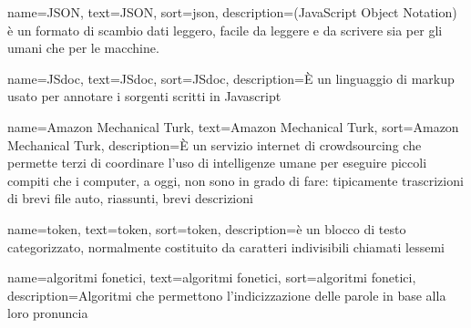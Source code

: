 {
    name=JSON,
    text=JSON,
    sort=json,
    description={(JavaScript Object Notation) è un formato di scambio dati leggero, facile da leggere e da scrivere sia per gli umani che per le macchine.}
}

{
    name=JSdoc,
    text=JSdoc,
    sort=JSdoc,
    description={È un linguaggio di markup usato per annotare i sorgenti scritti in Javascript}
}

{
    name=Amazon Mechanical Turk,
    text=Amazon Mechanical Turk,
    sort=Amazon Mechanical Turk,
    description={È un servizio internet di crowdsourcing che permette terzi di coordinare l'uso di intelligenze umane per eseguire piccoli compiti che i computer, a oggi, non sono in grado di fare: tipicamente trascrizioni di brevi file auto, riassunti, brevi descrizioni}
}

{
    name=token,
    text=token,
    sort=token,
    description={è un blocco di testo categorizzato, normalmente costituito da caratteri indivisibili chiamati lessemi}
}

{
    name=algoritmi fonetici,
    text=algoritmi fonetici,
    sort=algoritmi fonetici,
    description={Algoritmi che permettono l'indicizzazione delle parole in base alla loro pronuncia}
}

